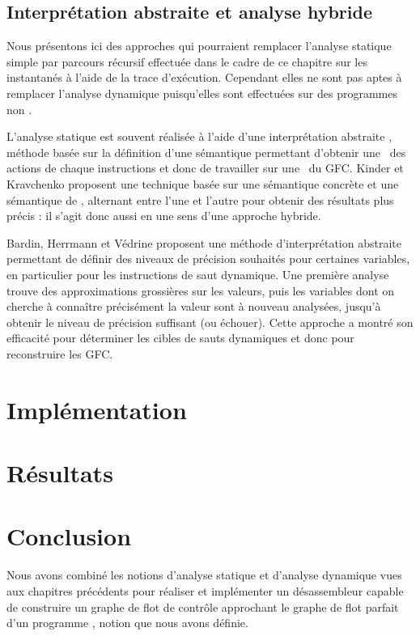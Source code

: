 \subsection{Interprétation abstraite et analyse hybride}
Nous présentons ici des approches qui pourraient remplacer l'analyse statique simple par parcours récursif effectuée dans le cadre de ce chapitre sur les instantanés à l'aide de la trace d'exécution. Cependant elles ne sont pas aptes à remplacer l'analyse dynamique puisqu'elles sont effectuées sur des programmes non \sms.

L'analyse statique est souvent réalisée à l'aide d'une interprétation abstraite \cite{CousotC77}, méthode basée sur la définition d'une sémantique permettant d'obtenir une \sura\ des actions de chaque instructions et donc de travailler sur une \sura\ du GFC.
Kinder et Kravchenko \cite{jakstab-alternating} proposent une technique basée sur une sémantique concrète et une sémantique de \sura, alternant entre l'une et l'autre pour obtenir des résultats plus précis : il s'agit donc aussi en une sens d'une approche hybride.

Bardin, Herrmann et Védrine \cite{BHV11} proposent une méthode d'interprétation abstraite permettant de définir des niveaux de précision souhaités pour certaines variables, en particulier pour les instructions de saut dynamique. 
Une première analyse trouve des approximations grossières sur les valeurs, puis les variables dont on cherche à connaître précisément la valeur sont à nouveau analysées, jusqu'à obtenir le niveau de précision suffisant (ou échouer).
Cette approche a montré son efficacité pour déterminer les cibles de sauts dynamiques et donc pour reconstruire les GFC.


\section{Implémentation}

\section{Résultats}


\section{Conclusion}
Nous avons combiné les notions d'analyse statique et d'analyse dynamique vues aux chapitres précédents pour réaliser et implémenter un désassembleur capable de construire un graphe de flot de contrôle approchant le graphe de flot parfait d'un programme \sm, notion que nous avons définie.